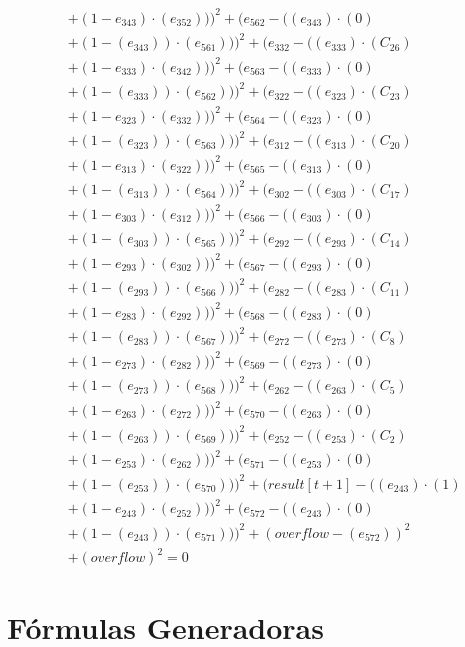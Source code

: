 \documentclass[10pt, a4paper]{article}
\begin{document}
\begin{align*}
& + (1 - e_{343})  \cdot  (e_{352})))^{2} + (e_{562} - ((e_{343}) \cdot (0) \\
& + (1 - (e_{343})) \cdot (e_{561})))^{2} + (e_{332} - ((e_{333})  \cdot  (C_{26}) \\
& + (1 - e_{333})  \cdot  (e_{342})))^{2} + (e_{563} - ((e_{333}) \cdot (0) \\
& + (1 - (e_{333})) \cdot (e_{562})))^{2} + (e_{322} - ((e_{323})  \cdot  (C_{23}) \\
& + (1 - e_{323})  \cdot  (e_{332})))^{2} + (e_{564} - ((e_{323}) \cdot (0) \\
& + (1 - (e_{323})) \cdot (e_{563})))^{2} + (e_{312} - ((e_{313})  \cdot  (C_{20}) \\
& + (1 - e_{313})  \cdot  (e_{322})))^{2} + (e_{565} - ((e_{313}) \cdot (0) \\
& + (1 - (e_{313})) \cdot (e_{564})))^{2} + (e_{302} - ((e_{303})  \cdot  (C_{17}) \\
& + (1 - e_{303})  \cdot  (e_{312})))^{2} + (e_{566} - ((e_{303}) \cdot (0) \\
& + (1 - (e_{303})) \cdot (e_{565})))^{2} + (e_{292} - ((e_{293})  \cdot  (C_{14}) \\
& + (1 - e_{293})  \cdot  (e_{302})))^{2} + (e_{567} - ((e_{293}) \cdot (0) \\
& + (1 - (e_{293})) \cdot (e_{566})))^{2} + (e_{282} - ((e_{283})  \cdot  (C_{11}) \\
& + (1 - e_{283})  \cdot  (e_{292})))^{2} + (e_{568} - ((e_{283}) \cdot (0) \\
& + (1 - (e_{283})) \cdot (e_{567})))^{2} + (e_{272} - ((e_{273})  \cdot  (C_{8}) \\
& + (1 - e_{273})  \cdot  (e_{282})))^{2} + (e_{569} - ((e_{273}) \cdot (0) \\
& + (1 - (e_{273})) \cdot (e_{568})))^{2} + (e_{262} - ((e_{263})  \cdot  (C_{5}) \\
& + (1 - e_{263})  \cdot  (e_{272})))^{2} + (e_{570} - ((e_{263}) \cdot (0) \\
& + (1 - (e_{263})) \cdot (e_{569})))^{2} + (e_{252} - ((e_{253})  \cdot  (C_{2}) \\
& + (1 - e_{253})  \cdot  (e_{262})))^{2} + (e_{571} - ((e_{253}) \cdot (0) \\
& + (1 - (e_{253})) \cdot (e_{570})))^{2} + (result[t+1] - ((e_{243})  \cdot  (1) \\
& + (1 - e_{243})  \cdot  (e_{252})))^{2} + (e_{572} - ((e_{243}) \cdot (0) \\
& + (1 - (e_{243})) \cdot (e_{571})))^{2} + (overflow - (e_{572}))^{2} \\
& + (overflow)^{2} = 0
\end{align*}\part{Fórmulas Generadoras}
\end{document}
